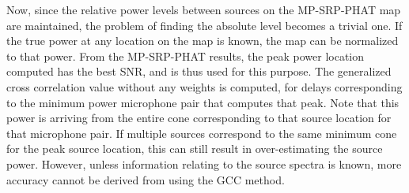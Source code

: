 Now, since the relative power levels between sources on the MP-SRP-PHAT map are maintained, the problem of finding the absolute level becomes a trivial one. If the true power at any location on the map is known, the map can be normalized to that  power. From the MP-SRP-PHAT results, the peak power location computed has the best SNR, and is thus used for this purpose. The generalized cross correlation value without any weights is computed, for delays corresponding to the minimum power microphone pair that computes that peak. Note that this power is arriving from the entire cone corresponding to that source location for that microphone pair. If multiple sources correspond to the same minimum cone for the peak source location, this can still result in over-estimating the source power. However, unless information relating to the source spectra is known, more accuracy cannot be derived from using the GCC method.

